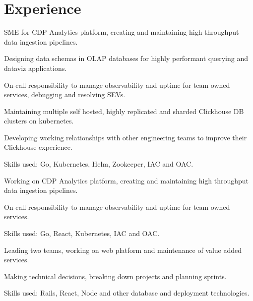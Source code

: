 \section{Experience}

    \begin{tightemize}
      \item SME for CDP Analytics platform, creating and maintaining high throughput data ingestion pipelines.
      \item Designing data schemas in OLAP databases for highly performant querying and dataviz applications.
      \item On-call responsibility to manage observability and uptime for team owned services, debugging and resolving SEVs.
      \item Maintaining multiple self hosted, highly replicated and sharded Clickhouse DB clusters on kubernetes.
      \item Developing working relationships with other engineering teams to improve their Clickhouse experience.
      \item Skills used: Go, Kubernetes, Helm, Zookeeper, IAC and OAC.
    \end{tightemize}
    \sectionsep

    \begin{tightemize}
      \item Working on CDP Analytics platform, creating and maintaining high throughput data ingestion pipelines.
      \item On-call responsibility to manage observability and uptime for team owned services.
      \item Skills used: Go, React, Kubernetes, IAC and OAC.
    \end{tightemize} 
    \sectionsep

    \begin{tightemize}
      \item Leading two teams, working on web platform and maintenance of value added services.
      \item Making technical decisions, breaking down projects and planning sprints.
      \item Skills used: Rails, React, Node and other database and deployment technologies.
    \end{tightemize} 
    \sectionsep

